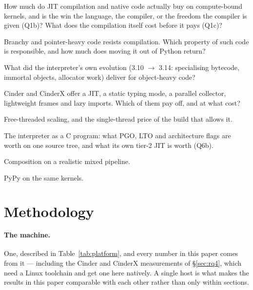 \documentclass[10pt,a4paper]{article}
\begin{document}
\begin{description}[leftmargin=2.6em,itemsep=1pt,font=\normalfont\bfseries]
  \item[Q1] How much do JIT compilation and native code actually buy on compute-bound
        kernels, and is the win the language, the compiler, or the freedom the compiler is
        given (Q1b)? What does the compilation itself cost before it pays (Q1c)?
  \item[Q2] Branchy and pointer-heavy code resists compilation. Which property of such code
        is responsible, and how much does moving it out of Python return?
  \item[Q3] What did the interpreter's own evolution (3.10 $\to$ 3.14: specialising
        bytecode, immortal objects, allocator work) deliver for object-heavy code?
  \item[Q4] Cinder and CinderX offer a JIT, a static typing mode, a parallel collector,
        lightweight frames and lazy imports. Which of them pay off, and at what cost?
  \item[Q5] Free-threaded scaling, and the single-thread price of the build that allows it.
  \item[Q6] The interpreter as a C program: what PGO, LTO and architecture flags are worth on
        one source tree, and what its own tier-2 JIT is worth (Q6b).
  \item[Q7] Composition on a realistic mixed pipeline.
  \item[Q8] PyPy on the same kernels.
\end{description}

\section{Methodology}
\label{sec:method}

\paragraph{The machine.}
One, described in Table~\ref{tab:platform}, and every number in this paper comes from it ---
including the Cinder and CinderX measurements of \S\ref{sec:rq4}, which need a Linux toolchain
and get one here natively. A single host is what makes the results in this paper comparable
with each other rather than only within sections.
\end{document}
